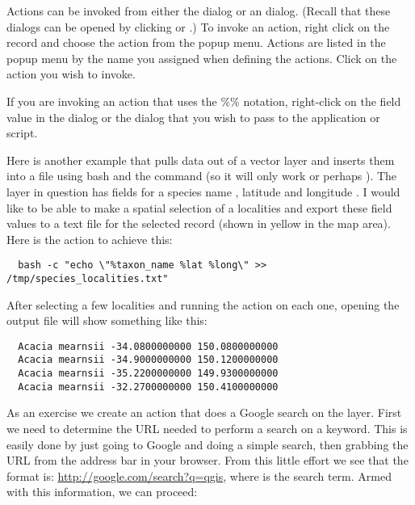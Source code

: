 Actions can be invoked from either the  dialog or an
 dialog. (Recall that these dialogs can be opened by
clicking  or
.) To invoke an action,
right click on the record and choose the action from the popup menu. Actions
are listed in the popup menu by the name you assigned when defining the
actions. Click on the action you wish to invoke.

If you are invoking an action that uses the \%\% notation, right-click on the
field value in the  dialog or the
 dialog that you wish to pass to the application or script.

Here is another example that pulls data out of a vector layer and inserts them
into a file using bash and the  command (so it will only work
\nix or perhaps \osx). The layer in question has fields for a species name
, latitude  and longitude
. I would like to be able to
make a spatial selection of a localities and export these field values to a
text file for the selected record (shown in yellow in the \qg map area). Here is
the action to achieve this:

\begin{verbatim}
  bash -c "echo \"%taxon_name %lat %long\" >> /tmp/species_localities.txt"
\end{verbatim}

After selecting a few localities and running the action on each one, opening
the output file will show something like this:

\begin{verbatim}
  Acacia mearnsii -34.0800000000 150.0800000000
  Acacia mearnsii -34.9000000000 150.1200000000
  Acacia mearnsii -35.2200000000 149.9300000000
  Acacia mearnsii -32.2700000000 150.4100000000
\end{verbatim}

As an exercise we create an action that does a Google search on the
 layer. First we need to determine the URL needed to perform a search on a
keyword. This is easily done by just going to Google and doing a simple
search, then grabbing the URL from the address bar in your browser. From this
little effort we see that the format is: \url{http://google.com/search?q=qgis},
where \usertext{\qg} is the search term. Armed with this information, we can
proceed:

